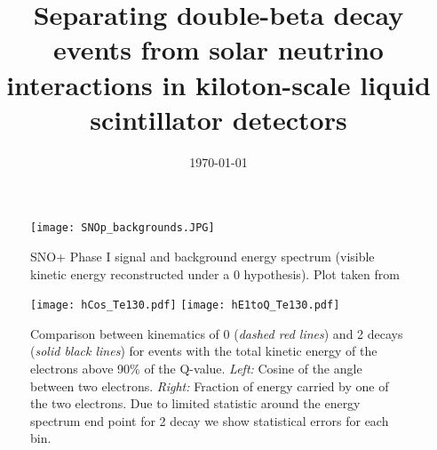 



\graphicspath{{plots/}}

\title{Separating double-beta decay events from solar neutrino
  interactions in kiloton-scale liquid scintillator detectors}


\begin{abstract}

\end{abstract}

\date{\today}

\maketitle

\tableofcontents

\linenumbers\relax %



\begin{figure}[ht]
  \centering
  \texttt{[image: SNOp\_backgrounds.JPG]}
  \caption{SNO+ Phase I signal and background energy spectrum (visible
    kinetic energy reconstructed under a 0{\nbb} hypothesis). Plot
    taken from~\cite{SNOp_paper}}
  \label{fig:SNOp_bkgs}
\end{figure}

\begin{figure*}[ht]
  \centering
  \texttt{[image: hCos\_Te130.pdf]}
  \texttt{[image: hE1toQ\_Te130.pdf]}
  \caption{Comparison between kinematics of 0{\nbb} (\emph{dashed red
      lines}) and 2{\nbb} decays (\emph{solid black lines}) for events
    with the total kinetic energy of the electrons above 90\% of the
    Q-value. \emph{Left:} Cosine of the angle between two
    electrons. \emph{Right:} Fraction of energy carried by one of the
    two electrons. Due to limited statistic around the energy spectrum
    end point for 2{\nbb} decay we show statistical errors for each
    bin.}
  \label{fig:Kinematics}
\end{figure*}


\clearpage %


\clearpage %

